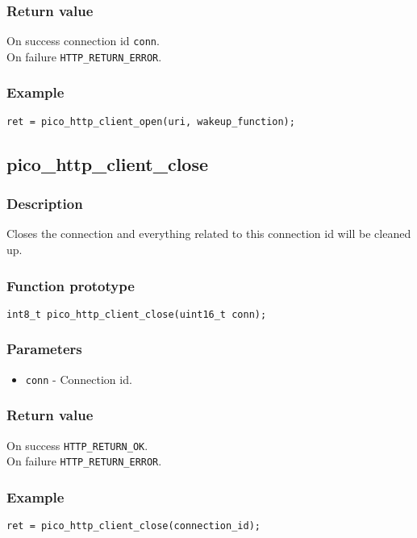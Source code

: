 \subsubsection*{Return value}
On success connection id \texttt{conn}.
\\On failure \texttt{HTTP\_RETURN\_ERROR}.

\subsubsection*{Example}
\begin{verbatim}
ret = pico_http_client_open(uri, wakeup_function);
\end{verbatim}


\subsection{pico\_http\_client\_close}

\subsubsection*{Description}
Closes the connection and everything related to this connection id will be cleaned up.

\subsubsection*{Function prototype}
\texttt{int8\_t pico\_http\_client\_close(uint16\_t conn);}

\subsubsection*{Parameters}
\begin{itemize}[noitemsep]
\item \texttt{conn} - Connection id.
\end{itemize}
\subsubsection*{Return value}
On success \texttt{HTTP\_RETURN\_OK}.
\\On failure \texttt{HTTP\_RETURN\_ERROR}.
\subsubsection*{Example}
\begin{verbatim}
ret = pico_http_client_close(connection_id);
\end{verbatim}

